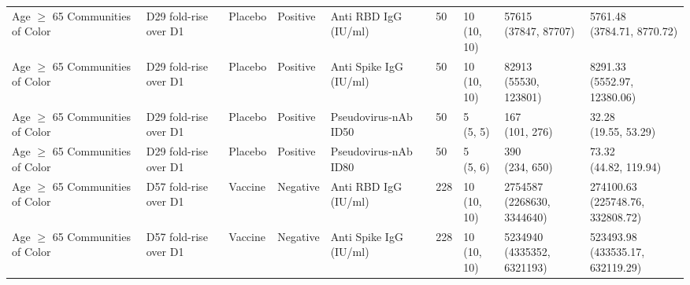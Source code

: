 \documentclass[]{book}
\theoremstyle{definition}
\theoremstyle{definition}
\theoremstyle{definition}
\newcommand{\1}{\mathbbm{1}}
\begin{document}
\begin{landscape}
\begin{ThreePartTable}
\begin{longtable}[t]{>{\raggedright\arraybackslash}p{2.7cm}llllllll}
\hspace{1em}Age $\geq$ 65 Communities of Color & D29 fold-rise over D1 & Placebo & Positive & Anti RBD IgG (IU/ml) & 50 & \makecell[l]{10\\(10, 10)} & \makecell[l]{57615\\(37847, 87707)} & \makecell[l]{5761.48\\(3784.71, 8770.72)}\\
\hspace{1em}Age $\geq$ 65 Communities of Color & D29 fold-rise over D1 & Placebo & Positive & Anti Spike IgG (IU/ml) & 50 & \makecell[l]{10\\(10, 10)} & \makecell[l]{82913\\(55530, 123801)} & \makecell[l]{8291.33\\(5552.97, 12380.06)}\\
\hspace{1em}Age $\geq$ 65 Communities of Color & D29 fold-rise over D1 & Placebo & Positive & Pseudovirus-nAb ID50 & 50 & \makecell[l]{5\\(5, 5)} & \makecell[l]{167\\(101, 276)} & \makecell[l]{32.28\\(19.55, 53.29)}\\
\hspace{1em}Age $\geq$ 65 Communities of Color & D29 fold-rise over D1 & Placebo & Positive & Pseudovirus-nAb ID80 & 50 & \makecell[l]{5\\(5, 6)} & \makecell[l]{390\\(234, 650)} & \makecell[l]{73.32\\(44.82, 119.94)}\\
\hspace{1em}Age $\geq$ 65 Communities of Color & D57 fold-rise over D1 & Vaccine & Negative & Anti RBD IgG (IU/ml) & 228 & \makecell[l]{10\\(10, 10)} & \makecell[l]{2754587\\(2268630, 3344640)} & \makecell[l]{274100.63\\(225748.76, 332808.72)}\\
\hspace{1em}Age $\geq$ 65 Communities of Color & D57 fold-rise over D1 & Vaccine & Negative & Anti Spike IgG (IU/ml) & 228 & \makecell[l]{10\\(10, 10)} & \makecell[l]{5234940\\(4335352, 6321193)} & \makecell[l]{523493.98\\(433535.17, 632119.29)}\\

\end{longtable}
\end{ThreePartTable}
\end{landscape}
\end{document}
